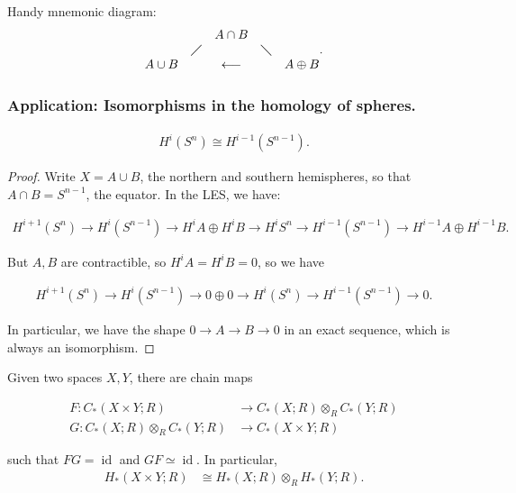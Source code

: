 Handy mnemonic diagram:
\begin{align*} \begin{matrix}  && A\cap B & \\ &\diagup &  & \diagdown \\ A\cup B & & \longleftarrow &  & A \oplus B \end{matrix} .\end{align*}

\hypertarget{application-isomorphisms-in-the-homology-of-spheres.}{%
\subsubsection{Application: Isomorphisms in the homology of
spheres.}\label{application-isomorphisms-in-the-homology-of-spheres.}}

\begin{proposition}[?]

\begin{align*}H^i(S^n) \cong H^{i-1}(S^{n-1}).\end{align*}

\end{proposition}

\begin{proof}

Write \(X = A \cup B\), the northern and southern hemispheres, so that
\(A \cap B = S^{n-1}\), the equator. In the LES, we have:

\begin{align*} H^{i+1}(S^n) \xrightarrow{} H^i(S^{n-1}) \xrightarrow{} H^iA \oplus H^i B \xrightarrow{} H^i S^n \xrightarrow{} H^{i-1}(S^{n-1}) \xrightarrow{} H^{i-1}A \oplus H^{i-1}B .\end{align*}

But \(A, B\) are contractible, so \(H^iA= H^iB = 0\), so we have

\begin{align*} H^{i+1}(S^n) \xrightarrow{} H^{i}(S^{n-1}) \xrightarrow{} 0 \oplus 0 \xrightarrow{}H^i(S^n) \xrightarrow{} H^{i-1}(S^{n-1}) \xrightarrow{} 0 .\end{align*}

In particular, we have the shape \(0 \to A \to B \to 0\) in an exact
sequence, which is always an isomorphism.

\end{proof}

\begin{theorem}

Given two spaces \(X, Y\), there are chain maps

\begin{align*} F: C_*(X\times Y; R)              &\to C_*(X; R) \otimes_R C_*(Y; R) \\ G: C_*(X; R) \otimes_R C_*(Y; R)  &\to C_*(X\times Y; R)  \end{align*}

such that \(FG = \operatorname{id}\) and \(GF \simeq\operatorname{id}\).
In particular,
\begin{align*} H_*(X\times Y; R) &\cong H_*(X; R) \otimes_R H_*(Y; R) .\end{align*}

\end{theorem}


